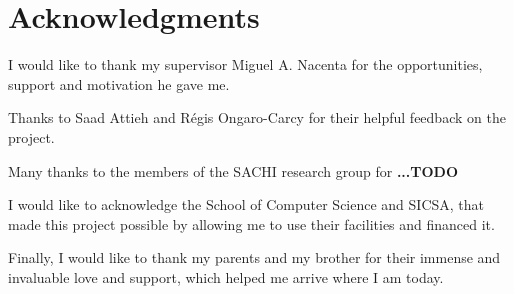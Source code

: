 \section{Acknowledgments}
I would like to thank my supervisor Miguel A. Nacenta for the opportunities, support and motivation he gave me. 

\par Thanks to Saad Attieh and Régis Ongaro-Carcy for their helpful feedback on the project.

\par Many thanks to the members of the SACHI research group for \textbf{...TODO } 

\par I would like to acknowledge the School of Computer Science and SICSA, that made this project possible by allowing me to use their facilities and financed it. 

\par Finally, I would like to thank my parents and my brother for their immense and invaluable love and support, which helped me arrive where I am today. 